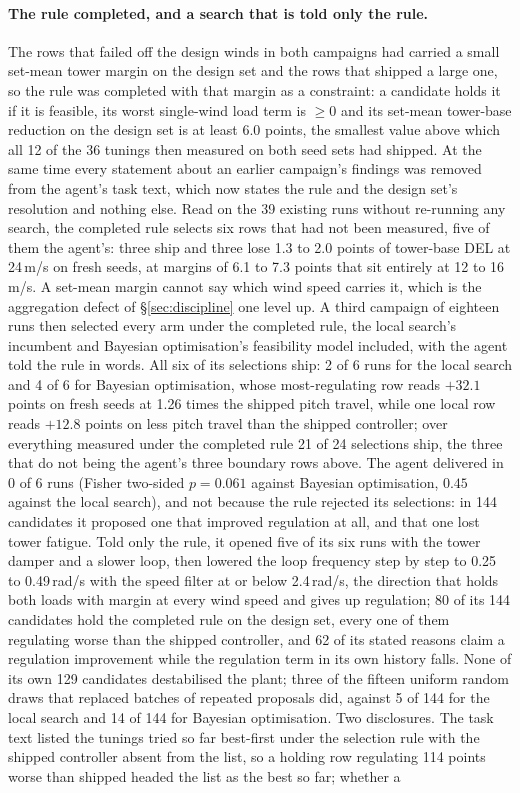 \documentclass{article}
\begin{document}
\paragraph{The rule completed, and a search that is told only the rule.} The rows that failed off the design winds in both campaigns had carried a small set-mean tower margin on the design set and the rows that shipped a large one, so the rule was completed with that margin as a constraint: a candidate holds it if it is feasible, its worst single-wind load term is $\ge 0$ and its set-mean tower-base reduction on the design set is at least 6.0 points, the smallest value above which all 12 of the 36 tunings then measured on both seed sets had shipped. At the same time every statement about an earlier campaign's findings was removed from the agent's task text, which now states the rule and the design set's resolution and nothing else. Read on the 39 existing runs without re-running any search, the completed rule selects six rows that had not been measured, five of them the agent's: three ship and three lose 1.3 to 2.0 points of tower-base DEL at 24\,m/s on fresh seeds, at margins of 6.1 to 7.3 points that sit entirely at 12 to 16\,m/s. A set-mean margin cannot say which wind speed carries it, which is the aggregation defect of §\ref{sec:discipline} one level up. A third campaign of eighteen runs then selected every arm under the completed rule, the local search's incumbent and Bayesian optimisation's feasibility model included, with the agent told the rule in words. All six of its selections ship: 2 of 6 runs for the local search and 4 of 6 for Bayesian optimisation, whose most-regulating row reads $+32.1$ points on fresh seeds at 1.26 times the shipped pitch travel, while one local row reads $+12.8$ points on less pitch travel than the shipped controller; over everything measured under the completed rule 21 of 24 selections ship, the three that do not being the agent's three boundary rows above. The agent delivered in 0 of 6 runs (Fisher two-sided $p = 0.061$ against Bayesian optimisation, $0.45$ against the local search), and not because the rule rejected its selections: in 144 candidates it proposed one that improved regulation at all, and that one lost tower fatigue. Told only the rule, it opened five of its six runs with the tower damper and a slower loop, then lowered the loop frequency step by step to 0.25 to 0.49\,rad/s with the speed filter at or below 2.4\,rad/s, the direction that holds both loads with margin at every wind speed and gives up regulation; 80 of its 144 candidates hold the completed rule on the design set, every one of them regulating worse than the shipped controller, and 62 of its stated reasons claim a regulation improvement while the regulation term in its own history falls. None of its own 129 candidates destabilised the plant; three of the fifteen uniform random draws that replaced batches of repeated proposals did, against 5 of 144 for the local search and 14 of 144 for Bayesian optimisation. Two disclosures. The task text listed the tunings tried so far best-first under the selection rule with the shipped controller absent from the list, so a holding row regulating 114 points worse than shipped headed the list as the best so far; whether a 
\end{document}
